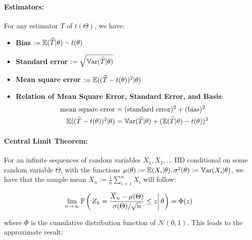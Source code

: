 \documentclass[a4paper]{article}
\begin{document}
            \paragraph{Estimators:}
                For any estimator $\widehat T$ of $t(\Theta)$, we have:
                \begin{itemize}
                    \item \textbf{Bias} $:= \mathbb{E}(\widehat T | \theta) - t(\theta)$
                    \item \textbf{Standard error} $:= \sqrt{\mathbb{V}\text{ar}(\widehat T |
                        \theta)}$
                    \item \textbf{Mean square error} $:= \mathbb{E}((\widehat T -
                        t(\theta))^2 | \theta)$
                    \item \textbf{Relation of Mean Square Error, Standard Error,
                        and Basis}:
                        \begin{align*}
                            \text{mean square error} & =
                                (\text{standard error})^2 + (\text{bias})^2 \\
                            \mathbb{E}((\widehat T - t(\theta))^2 | \theta) & = \mathbb{V}\text{ar}(
                                \widehat T | \theta) + (\mathbb{E}(\widehat T | \theta)
                                - t(\theta))^2
                        \end{align*}
                \end{itemize}

            \paragraph{Central Limit Theorem:}
                For an infinite sequences of random variables $X_1, X_2, ...$
                IID conditional on some random variable $\Theta$, with the
                functions $\mu(\theta) := \mathbb{E}(X_i | \theta), \sigma^2(\theta) :=
                \mathbb{V}\text{ar}(X_i | \theta)$, we have that the sample mean $\overline X_n
                := \frac{1}{n} \sum\limits_{i=1}^n X_i$ will follow:

                \[
                    \lim_{n \to \infty} \mathbb{P}\left(\left.Z_h = \frac{\overline
                    X_n - \mu(\Theta)}{\sigma(\Theta)/\sqrt{n}} \leq z \right|
                    \theta\right) = \Phi(z)
                \]

                where $\Phi$ is the cumulative distribution function of
                $\mathcal{N}(0, 1)$. This leads to the approximate result:
\end{document}
